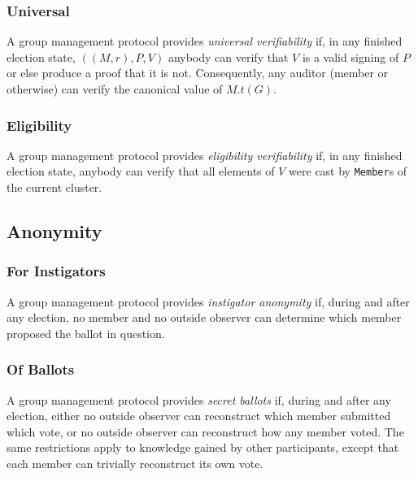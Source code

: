     \subsubsection{Universal}
    A group management protocol provides \emph{universal verifiability} if, in
    any finished election state, $((M,r), P, V)$%
    anybody can verify that $V$ is a valid signing of $P$ or else produce a
    proof that it is not. Consequently, any auditor (member or otherwise) can
    verify the canonical value of $M.t(G)$.

    \subsubsection{Eligibility}
    A group management protocol provides \emph{eligibility verifiability} if, in
    any finished election state, anybody can verify that all elements of $V$
    were cast by \texttt{Member}s of the current cluster.
  \subsection{Anonymity}
    \subsubsection{For Instigators}
    A group management protocol provides \emph{instigator anonymity} if, during
    and after any election, no member and no outside observer can determine
    which member proposed the ballot in question.

    \subsubsection{Of Ballots}
    A group management protocol provides \emph{secret ballots} if, during and
    after any election, either no outside observer can reconstruct which member
    submitted which vote, or no outside observer can reconstruct how any
    member voted. The same restrictions apply to knowledge gained by other
    participants, except that each member can trivially reconstruct its own vote.

